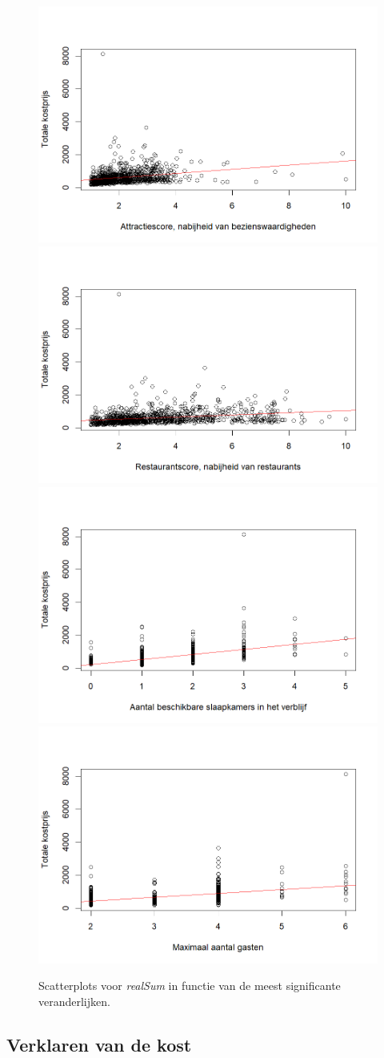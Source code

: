 \documentclass[a4paper]{kulakarticle}
\begin{document}
	\begin{figure}
		\centering
		\includegraphics[width=0.49\linewidth]{Figuren/correlatievanattr}
		\includegraphics[width=0.49\linewidth]{Figuren/correlatievanrest}
		\includegraphics[width=0.49\linewidth]{Figuren/correlatievanbedrooms}
		\includegraphics[width=0.49\linewidth]{Figuren/correlatievancapacity}
		
		\caption{Scatterplots voor \textit{realSum} in functie van de meest significante veranderlijken.}
		\label{fig:correlatievanattr}
	\end{figure}




	\subsection{Verklaren van de kost}
	
\end{document}
